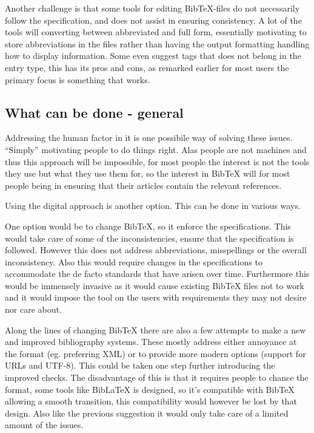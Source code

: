 Another challenge is that some tools for editing Bib{\TeX}-files do
not necessarily follow the specification, and does not assist in
ensuring consistency.  A lot of the tools will converting between
abbreviated and full form, essentially motivating to store
abbreviations in the files rather than having the output formatting
handling how to display information.  Some even suggest tags that does
not belong in the entry type, this has its pros and cons, as remarked
earlier for most users the primary focus is something that works.

\subsection{What can be done - general }
Addressing the human factor in it is one possibile way of solving
these issues.  ``Simply'' motivating people to do things right.  Alas
people are not machines and thus this approach will be impossible, for
most people the interest is not the tools they use but what they use
them for, so the interest in Bib{\TeX} will for most people being in
ensuring that their articles contain the relevant references.

Using the digital approach is another option.  This can be done in
various ways.

One option would be to change Bib{\TeX}, so it enforce the
specifications.  This would take care of some of the inconsistencies,
ensure that the specification is followed.  However this does not
address abbreviations, misspellings or the overall inconsistency.
Also this would require changes in the specifications to accommodate
the de facto standards that have arisen over time.  Furthermore this
would be immensely invasive as it would cause existing Bib{\TeX} files
not to work and it would impose the tool on the users with
requirements they may not desire nor care about.

Along the lines of changing Bib{\TeX} there are also a few attempts to
make a new and improved bibliography systems.  These mostly address
either annoyance at the format (eg. preferring XML) or to provide more
modern options (support for URLs and UTF-8).  This could be taken one
step further introducing the improved checks.  The disadvantage of
this is that it requires people to chance the format, some tools like
Bib{\LaTeX} is designed, so it's compatible with Bib{\TeX} allowing a
smooth transition, this compatibility would however be lost by that
design.  Also like the previous suggestion it would only take care of
a limited amount of the issues.

